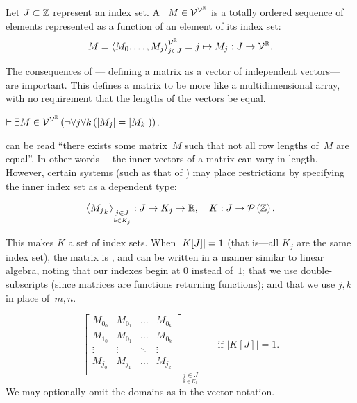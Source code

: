 \begin{definition}[Matrix]
  Let $J\subset\Int$ represent an index set.
  A ~$M\in\Matrices$ is a totally ordered sequence of
   elements represented as a function of an element of its index set:
  \begin{equation}
    M = \Vector{M_0,\ldots,M_j}^{\Vectors^\Real}_{j\in J}
      = j \mapsto M_j : J \rightarrow \Vectors^\Real.
  \end{equation}
\end{definition}

The consequences of ---%
  defining a matrix as a vector of independent vectors---%
  are important.
This defines a matrix to be more like a multidimensional array,
  with no requirement that the lengths of the vectors be equal.

\begin{corollary}
  $\infer \Exists{M\in\Matrices}{\neg\Forall*{j}{\Forall{k}{\len{M_j} = \len{M_k}}}}$.
\end{corollary}

 can be read ``there exists some matrix~$M$ such that
  not all row lengths of~$M$ are equal''.
In other words---%
  the inner vectors of a matrix can vary in length.
However,
  certain systems (such as that of ) may place
  restrictions by specifying the inner index set as a dependent type:

\begin{equation}
  \MFam{M}jJkK : J \rightarrow K_j \rightarrow \Real, \quad K : J \rightarrow \PSet\Int.
\end{equation}

This makes $K$ a set of index sets.
When $\len{K[J]}=1$
  (that is---all $K_j$ are the same index set),
  the matrix is ,
    and can be written in a manner similar to linear algebra,
      noting that our indexes begin at $0$ instead of~$1$;
      that we use double-subscripts
        (since matrices are functions returning functions);
      and that we use $j,k$ in place of~$m,n$.

\begin{equation}
  \begin{bmatrix}
    M_{0_0} & M_{0_1} & \dots & M_{0_k} \\
    M_{1_0} & M_{0_1} & \dots & M_{0_k} \\
    \vdots  & \vdots  & \ddots & \vdots \\
    M_{j_0} & M_{j_1} & \dots & M_{j_k} \\
  \end{bmatrix}_{\underset{k\in K_0}{j\in J}}
  \qquad
  \text{if $|K[J]|=1$}.
\end{equation}
We may optionally omit the domains as in the vector notation.

